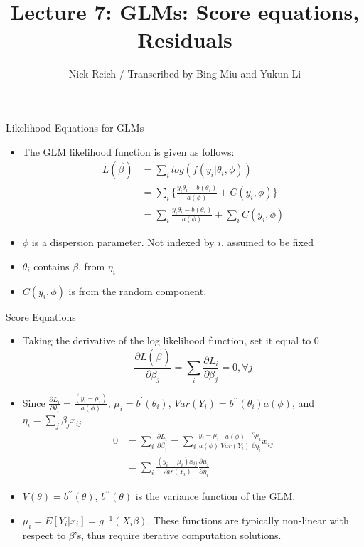 \documentclass[ignorenonframetext,]{beamer}
\title{Lecture 7: GLMs: Score equations, Residuals}
\author{Nick Reich / Transcribed by Bing Miu and Yukun Li}
\date{}
\providecommand{\tightlist}{%
  \setlength{\itemsep}{0pt}\setlength{\parskip}{0pt}}
\begin{document}
\frame{\titlepage}

\begin{frame}{Likelihood Equations for GLMs}

\begin{itemize}
\item
  The GLM likelihood function is given as follows: \[
  \begin{aligned}
  L(\overset{\rightharpoonup}{\beta})
  &= \sum_i log (f(y_i | \theta_i, \phi))\\
  &= \sum_i \Big\{\frac{y_i\theta_i - b(\theta_i)}{a(\phi)} + C(y_i, \phi) \Big\} \\
  &= \sum_i \frac{y_i\theta_i - b(\theta_i)}{a(\phi)} + \sum_i C(y_i, \phi)
  \end{aligned}
  \]
\item
  \(\phi\) is a dispersion parameter. Not indexed by \(i\), assumed to
  be fixed
\item
  \(\theta_i\) contains \(\beta\), from \(\eta_i\)
\item
  \(C(y_i, \phi)\) is from the random component.
\end{itemize}

\end{frame}

\begin{frame}{Score Equations}

\begin{itemize}
\tightlist
\item
  Taking the derivative of the log likelihood function, set it equal to
  0
  \[ \frac{\partial L(\overset{\rightharpoonup}{\beta}) }{\partial \beta_j} = \sum_i\frac{\partial L_i}{\partial \beta_j} = 0, \forall j\]
\item
  Since
  \(\frac{\partial L_i}{\partial\theta_i} = \frac{(y_i-\mu_i)}{a(\phi)}\),
  \(\mu_i=b^\prime(\theta_i)\),
  \(Var(Y_i)=b^{\prime \prime} (\theta_i)a(\phi)\), and
  \(\eta_i=\sum_j\beta_jx_{ij}\) \[
  \begin{aligned}
  0 &= \sum_i\frac{\partial L_i}{\partial \beta_j} = \sum_{i}\frac{y_i-\mu_i}{a(\phi)} \frac{a(\phi)}{Var(Y_i)} \frac{\partial \mu_i}{\partial\eta_i} x_{ij} \\
  &=\sum_{i}\frac{(y_i - \mu_i)x_{ij}}{Var(Y_i)}\frac{\partial \mu_i}{\partial \eta_i}
  \end{aligned}
  \]
\item
  \(V(\theta)= b^{\prime \prime} (\theta)\),
  \(b^{\prime \prime} (\theta)\) is the variance function of the GLM.
\item
  \(\mu_i=E[Y_i|x_i] = g^{-1}(X_i\beta)\). These functions are typically
  non-linear with respect to \(\beta\)'s, thus require iterative
  computation solutions.
\end{itemize}

\end{frame}
\end{document}
